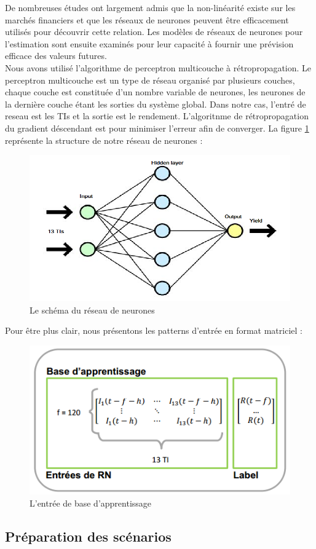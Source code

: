 De nombreuses études ont largement admis que la non-linéarité existe sur les marchés financiers et que les réseaux de neurones peuvent être efficacement utilisés pour découvrir cette relation. Les modèles de réseaux de neurones pour l'estimation sont ensuite examinés pour leur capacité à fournir une prévision efficace des valeurs futures.\\

Nous avons utilisé l'algorithme de perceptron multicouche à rétropropagation. Le perceptron multicouche est un type de réseau organisé par plusieurs couches, chaque couche est constituée d'un nombre variable de neurones, les neurones de la dernière couche étant les sorties du système global. Dans notre cas, l'entré de reseau est les TIs et la sortie est le rendement. L'algoritnme de rétropropagation du gradient déscendant est pour minimiser l'erreur afin de converger. La figure \ref{fig:RN} représente la structure de notre réseau de neurones :

\begin{figure}[H]
\centering
\includegraphics[width=.9\linewidth, scale=0.2]
{plot/RN.png}
\caption{Le schéma du réseau de neurones}
\label{fig:RN}
\end{figure}

Pour être plus clair, nous présentons les patterns d'entrée en format matriciel : 

\begin{figure}[H]
\centering
\includegraphics[width=.9\linewidth, scale=0.2]
{plot/base.png}
\caption{L'entrée de base d'apprentissage}
\label{fig:base}
\end{figure}


\subsection{Préparation des scénarios}





